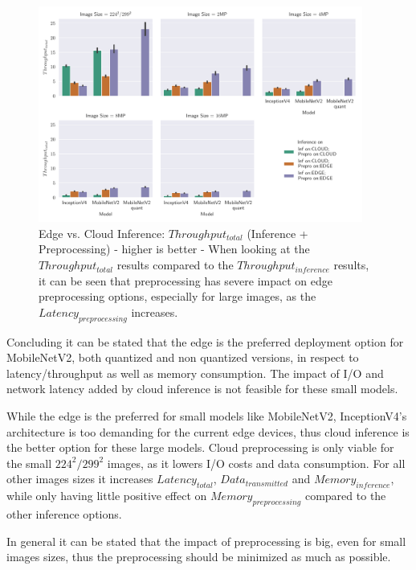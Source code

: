 \begin{figure}[!htb]
\centering
\includegraphics[width=0.95\textwidth]{./Bilder/single_plots/edge_vs_cloud_plots/Edge_vs_Cloud_Inference_Throughput_with_Preprocessing.pdf}
\caption[Edge vs. Cloud Inference:  $Throughput_{total}$ - higher is better]{Edge vs. Cloud Inference:  $Throughput_{total}$ (Inference + Preprocessing) - higher is better - 
When looking at the $Throughput_{total}$ results compared to the $Throughput_{inference}$ results, it can be seen that preprocessing has severe impact on edge preprocessing options, especially for large images, as the $Latency_{preprocessing}$ increases.}
\label{fig:EdgeVsCloudTotalThroughput}
\end{figure}




Concluding it can be stated that the edge is the preferred deployment option for MobileNetV2, both quantized and non quantized versions, in respect to latency/throughput as well as memory consumption.
The impact of I/O and network latency added by cloud inference is not feasible for these small models.

While the edge is the preferred for small models like MobileNetV2, InceptionV4's architecture is too demanding for the current edge devices, thus cloud inference is the better option for these large models.
Cloud preprocessing is only viable for the small $224^2/299^2$ images, as it lowers I/O costs and data consumption. For all other images sizes it increases $Latency_{total}$, $Data_{transmitted}$ and $Memory_{inference}$, while only having little positive effect on $Memory_{preprocessing}$ compared to the other inference options.

In general it can be stated that the impact of preprocessing is big, even for small images sizes, thus the preprocessing should be minimized as much as possible.


